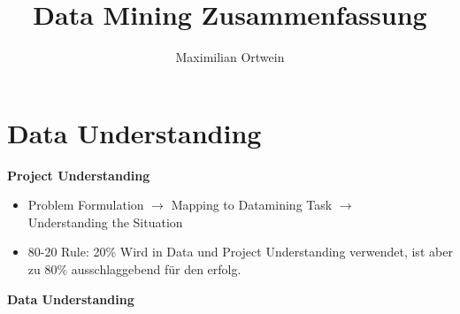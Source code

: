 \documentclass[a4paper]{scrartcl}
\begin{document}
\author{Maximilian Ortwein}
\title{Data Mining Zusammenfassung }
\fancyfoot[C]{\thepage}
\renewcommand{\footrulewidth}{0.5pt}
\renewcommand{\headrulewidth}{0.5pt}
\maketitle
\tableofcontents
\pagebreak

\section{Data Understanding} 
\textbf{Project Understanding}\\
\begin{itemize}
\item Problem Formulation $\to$ Mapping to Datamining Task $\to$ \\Understanding the Situation
\item 80-20 Rule: 20\% Wird in Data und Project Understanding verwendet, ist aber zu 80\% ausschlaggebend für den erfolg.
\end{itemize}
\textbf{Data Understanding}\\
\end{document}
